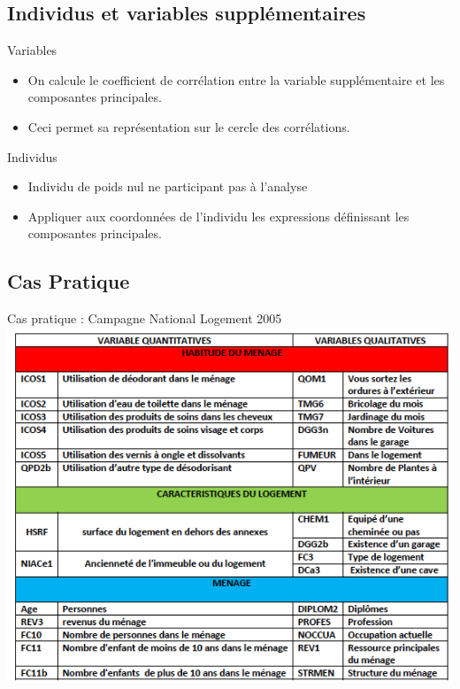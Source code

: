 \documentclass[10pt]{beamer}
\begin{document}
\subsection{Individus et variables supplémentaires }



\begin{frame}{ Variables }

 \begin{itemize}
 \item   On calcule le coefficient de corrélation entre la variable supplémentaire et les composantes principales. 
 
 \item Ceci permet sa représentation sur le cercle des corrélations.
 
 \end{itemize}


\end{frame}


 

\begin{frame}{ Individus }

 \begin{itemize}
 \item   Individu de poids nul ne participant pas à l’analyse  
 
\item Appliquer aux coordonnées de l’individu les expressions
définissant les composantes principales.
 \end{itemize}


\end{frame}

\subsection{Cas Pratique}
\begin{frame}{ Cas pratique : Campagne National Logement 2005}
\centering 
\includegraphics[scale=0.5]{CNL1} 

\end{frame}
\end{document}
